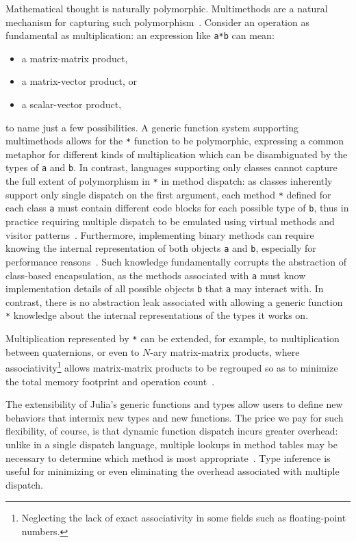 \documentclass[10pt, preprint]{sigplanconf}
\begin{document}
Mathematical thought is
naturally polymorphic. Multimethods are a natural mechanism for capturing such
polymorphism~\cite{Bezanson2014b,Chen2014}. Consider an operation as
fundamental as multiplication: an expression like \verb|a*b| can mean:

\begin{itemize}
	\item a matrix-matrix product,
	\item a matrix-vector product, or
	\item a scalar-vector product,
\end{itemize}
%
to name just a few possibilities. A generic function system supporting
multimethods allows for the \verb|*| function to be polymorphic, expressing a
common metaphor for different kinds of multiplication which can be
disambiguated by the types of \verb|a| and \verb|b|. In contrast, languages
supporting only classes cannot capture the full extent of polymorphism in
\verb|*| in method dispatch: as classes inherently support only single dispatch
on the first argument, each method \verb|*| defined for each class \verb|a|
must contain different code blocks for each possible type of \verb|b|, thus in
practice requiring multiple dispatch to be emulated using virtual methods and
visitor patterns~\cite{designpatterns}. Furthermore, implementing binary methods can
require knowing the internal representation of both objects \verb|a| and
\verb|b|, especially for performance reasons~\cite{Bruce1995}. Such knowledge
fundamentally corrupts the abstraction of class-based encapsulation, as the
methods associated with \verb|a| must know implementation details of all
possible objects \verb|b| that \verb|a| may interact with.
In contrast, there is no abstraction leak associated with allowing a generic
function \verb|*| knowledge about the internal representations of the types it
works on.

Multiplication represented by \verb|*| can be extended, for
example, to multiplication between quaternions, or even to $N$-ary
matrix-matrix products, where associativity\footnote{Neglecting the lack of
exact associativity in some fields such as floating-point numbers.} allows
matrix-matrix products to be regrouped so as to minimize the total memory
footprint and operation count~\cite{Hu1984}.

The extensibility of Julia's generic functions and types allow users to
define new behaviors that intermix new types and new functions. The price we pay
for such flexibility, of course, is that dynamic function dispatch incurs
greater overhead: unlike in a single dispatch language, multiple lookups in
method tables may be necessary to determine which method is most
appropriate~\cite{Bruce1995}. Type inference is
useful for minimizing or even eliminating the
overhead associated with multiple dispatch.
\end{document}
